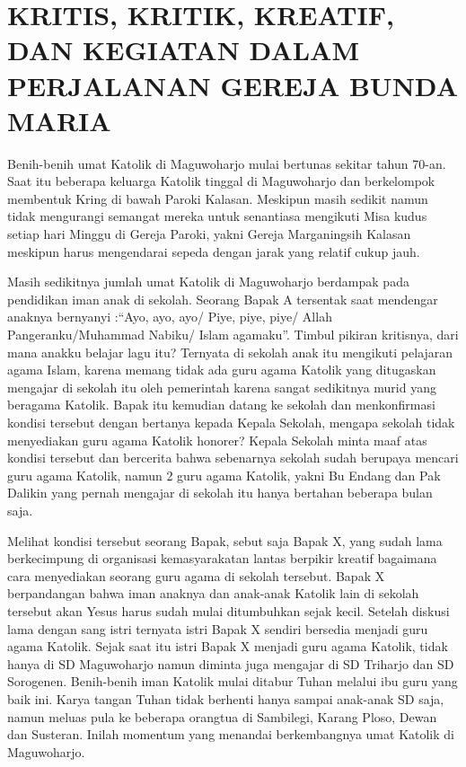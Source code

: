 \newpage
\section*{\centering\Large KRITIS, KRITIK, KREATIF, DAN KEGIATAN DALAM PERJALANAN GEREJA BUNDA MARIA}

\small
	Benih-benih umat Katolik di Maguwoharjo mulai bertunas sekitar tahun 70-an. Saat itu beberapa keluarga Katolik tinggal di Maguwoharjo dan berkelompok membentuk Kring di bawah Paroki Kalasan. Meskipun masih sedikit namun tidak mengurangi semangat mereka untuk senantiasa mengikuti Misa kudus setiap hari Minggu di Gereja Paroki, yakni Gereja Marganingsih Kalasan meskipun harus mengendarai sepeda dengan jarak yang relatif cukup jauh.

	Masih sedikitnya jumlah umat Katolik di Maguwoharjo berdampak pada pendidikan iman anak di sekolah. Seorang Bapak A tersentak saat mendengar anaknya bernyanyi :``Ayo, ayo, ayo/ Piye, piye, piye/ Allah Pangeranku/Muhammad Nabiku/ Islam agamaku''. Timbul pikiran kritisnya, dari mana anakku belajar lagu itu? Ternyata di sekolah anak itu mengikuti pelajaran agama Islam, karena memang tidak ada guru agama Katolik yang ditugaskan mengajar di sekolah itu oleh pemerintah karena sangat sedikitnya murid yang beragama Katolik. Bapak itu kemudian datang ke sekolah dan menkonfirmasi kondisi tersebut dengan bertanya kepada Kepala Sekolah, mengapa sekolah tidak menyediakan guru agama Katolik honorer? Kepala Sekolah minta maaf atas kondisi tersebut dan bercerita bahwa sebenarnya sekolah sudah berupaya mencari guru agama Katolik, namun 2 guru agama Katolik, yakni Bu Endang dan Pak Dalikin yang pernah mengajar di sekolah itu hanya bertahan beberapa bulan saja.

	Melihat kondisi tersebut seorang Bapak, sebut saja Bapak X, yang sudah lama berkecimpung di organisasi kemasyarakatan lantas berpikir kreatif bagaimana cara menyediakan seorang guru agama di sekolah tersebut. Bapak X berpandangan bahwa iman anaknya dan anak-anak Katolik lain di sekolah tersebut akan Yesus harus sudah mulai ditumbuhkan sejak kecil. Setelah diskusi lama dengan sang istri ternyata istri Bapak X sendiri bersedia menjadi guru agama Katolik. Sejak saat itu istri Bapak X menjadi guru agama Katolik, tidak hanya di SD Maguwoharjo namun diminta juga mengajar di SD Triharjo dan SD Sorogenen. Benih-benih iman Katolik mulai ditabur Tuhan melalui ibu guru yang baik ini. Karya tangan Tuhan tidak berhenti hanya sampai anak-anak SD saja, namun meluas pula ke beberapa orangtua di Sambilegi, Karang Ploso, Dewan dan Susteran. Inilah momentum yang menandai berkembangnya umat Katolik di Maguwoharjo.

